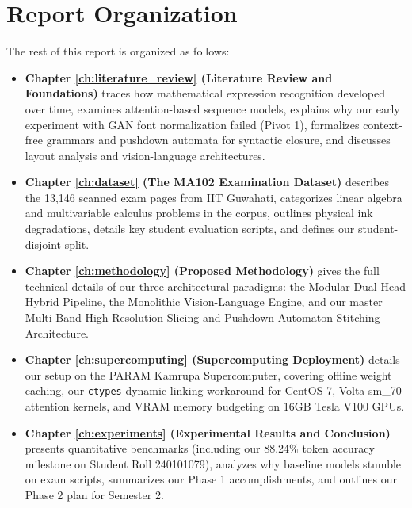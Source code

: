 \section{Report Organization}
\label{sec:organization}

The rest of this report is organized as follows:
\begin{itemize}
    \item \textbf{Chapter \ref{ch:literature_review} (Literature Review and Foundations)} traces how mathematical expression recognition developed over time, examines attention-based sequence models, explains why our early experiment with GAN font normalization failed (Pivot 1), formalizes context-free grammars and pushdown automata for syntactic closure, and discusses layout analysis and vision-language architectures.
    \item \textbf{Chapter \ref{ch:dataset} (The MA102 Examination Dataset)} describes the 13,146 scanned exam pages from IIT Guwahati, categorizes linear algebra and multivariable calculus problems in the corpus, outlines physical ink degradations, details key student evaluation scripts, and defines our student-disjoint split.
    \item \textbf{Chapter \ref{ch:methodology} (Proposed Methodology)} gives the full technical details of our three architectural paradigms: the Modular Dual-Head Hybrid Pipeline, the Monolithic Vision-Language Engine, and our master Multi-Band High-Resolution Slicing and Pushdown Automaton Stitching Architecture.
    \item \textbf{Chapter \ref{ch:supercomputing} (Supercomputing Deployment)} details our setup on the PARAM Kamrupa Supercomputer, covering offline weight caching, our \texttt{ctypes} dynamic linking workaround for CentOS 7, Volta sm\_70 attention kernels, and VRAM memory budgeting on 16GB Tesla V100 GPUs.
    \item \textbf{Chapter \ref{ch:experiments} (Experimental Results and Conclusion)} presents quantitative benchmarks (including our 88.24\% token accuracy milestone on Student Roll 240101079), analyzes why baseline models stumble on exam scripts, summarizes our Phase 1 accomplishments, and outlines our Phase 2 plan for Semester 2.
\end{itemize}
